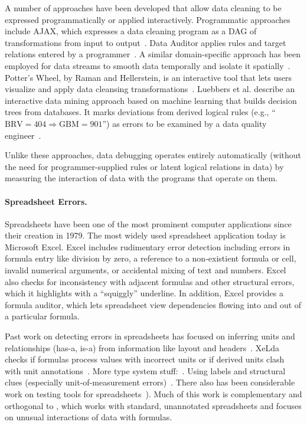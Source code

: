 A number of approaches have been developed that allow data cleaning to
be expressed programmatically or applied interactively. Programmatic
approaches include AJAX, which expresses a data cleaning program as a
DAG of transformations from input to
output~\cite{Galhardas:2000:AED:342009.336568}. Data Auditor applies
rules and target relations entered by a
programmer~\cite{Golab:2010:DAE:1920841.1921060}. A similar
domain-specific approach has been employed for data streams to smooth
data temporally and isolate it spatially~\cite{1617508}. Potter's
Wheel, by Raman and Hellerstein, is an interactive tool that lets
users visualize and apply data cleansing
transformations~\cite{Raman:2001:PWI:645927.672045}. 
Luebbers et al. describe an interactive data mining approach based on
machine learning that builds decision trees from databases. It marks
deviations from derived logical rules (e.g., ``$\mbox{BRV} =
404 \Rightarrow \mbox{GBM} = 901$'') as errors to be examined by a
data quality engineer~\cite{Luebbers:2003:SDD:1315451.1315499}.

Unlike these approaches, data debugging operates entirely
automatically (without the need for programmer-supplied rules or
latent logical relations in data) by measuring the interaction of data
with the programs that operate on them.
 

\paragraph{Spreadsheet Errors.}
Spreadsheets have been one of the most prominent computer applications
since their creation in 1979.
 The most widely used spreadsheet application today is Microsoft
Excel. Excel includes rudimentary error detection including errors in
formula entry like division by zero, a reference to a non-existient
formula or cell, invalid numerical arguments, or accidental mixing of
text and numbers.
Excel also checks for inconsistency with adjacent formulas and other
structural errors, which it highlights with a ``squiggly'' underline. In addition, Excel provides a formula auditor, which lets spreadsheet view dependencies flowing into and out of a particular formula.

Past work on detecting errors in spreadsheets has focused on inferring
units and relationships (has-a, is-a) from information like layout and
headers~\cite{DBLP:conf/kbse/AhmadAGK03}. XeLda checks if formulas
process values with incorrect units or if derived units clash with
unit annotations~\cite{Antoniu:2004:VUC:998675.999448}.  More type
system stuff:~\cite{Erwig:2005:AGM:1062455.1062494}. Using labels and
structural clues (especially unit-of-measurement
errors)~\cite{Chambers:2010:RSL:1860134.1860346}. There also has been
considerable work on testing tools for
spreadsheets~\cite{fisher2006scaling,rothermel1998you,rothermel2001methodology,Carver:2006:EET:1159733.1159775}). Much
of this work is complementary and orthogonal to \checkcell{}, which
works with standard, unannotated spreadsheets and focuses on unusual
interactions of data with formulas.



